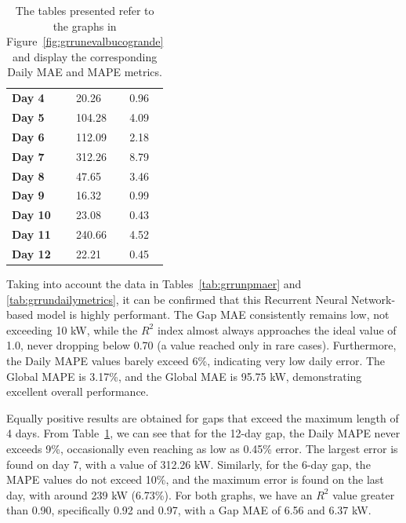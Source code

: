 \begin{table}[H]
\begin{minipage}[t]{.45\textwidth}
\begin{center}
\begin{tabular}[t]{l|l|l}
				\textbf{Day 4}  & 20.26  & 0.96                          \\
				\textbf{Day 5}  & 104.28 & 4.09                          \\
				\textbf{Day 6}  & 112.09 & 2.18                          \\
				\textbf{Day 7}  & 312.26 & 8.79                          \\
				\textbf{Day 8}  & 47.65  & 3.46                          \\
				\textbf{Day 9}  & 16.32  & 0.99                          \\
				\textbf{Day 10} & 23.08  & 0.43                          \\
				\textbf{Day 11} & 240.66 & 4.52                          \\
				\textbf{Day 12} & 22.21  & 0.45
			\end{tabular}
		\end{center}
	\end{minipage}
	\caption{The tables presented refer to the graphs in Figure~\ref{fig:grrunevalbucogrande} and display the corresponding Daily MAE and MAPE metrics.}\label{tab:grrunbuchigrandi}
\end{table}

Taking into account the data in Tables~\ref{tab:grrunpmaer}
and \ref{tab:grrundailymetrics}, it can be confirmed that this
Recurrent Neural Network-based model is highly performant.
The Gap MAE consistently remains low, not exceeding 10 kW,
while the $R^2$ index almost always approaches the ideal value of 1.0\cite{metrics}, never dropping below 0.70 (a value reached only in rare cases). Furthermore, the Daily MAPE values barely exceed 6\%, indicating very low daily error. The Global MAPE is 3.17\%, and the Global MAE is 95.75 kW, demonstrating excellent overall performance.

Equally positive results are obtained for gaps that exceed the
maximum length of 4 days.
From Table~\ref{tab:grrunbuchigrandi}, we can see that for the
12-day gap, the Daily MAPE never exceeds 9\%, occasionally even reaching as low as 0.45\% error. The largest error is found on day 7, with a value of 312.26 kW.
Similarly, for the 6-day gap, the MAPE values do not exceed 10\%,
and the maximum error is found on the last day, with around
239 kW (6.73\%).
For both graphs, we have an $R^2$ value greater than 0.90, specifically 0.92 and 0.97, with a Gap MAE of 6.56 and 6.37 kW.

